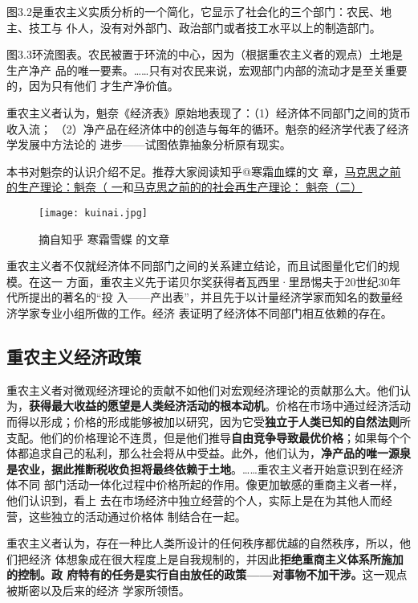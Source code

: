 图3.2是重农主义实质分析的一个简化，它显示了社会化的三个部门：农民、地主、技工与
仆人，没有对外部门、政治部门或者技工水平以上的制造部门。

图3.3环流图表。农民被置于环流的中心，因为（根据重农主义者的观点）土地是生产净产
品的唯一要素。……只有对农民来说，宏观部门内部的流动才是至关重要的，因为只有他们
才生产净价值。

重农主义者认为，魁奈《经济表》原始地表现了：（1）经济体不同部门之间的货币收入流；
（2）净产品在经济体中的创造与每年的循环。魁奈的经济学代表了经济学发展中方法论的
进步——试图依靠抽象分析原有现实。

本书对魁奈的认识介绍不足。推荐大家阅读知乎@寒霜血蝶的文
章，\href{https://zhuanlan.zhihu.com/p/28194917}{马克思之前的生产理论：魁奈（
  一}和\href{https://zhuanlan.zhihu.com/p/28210526}{马克思之前的的社会再生产理论：
  魁奈（二）}

\begin{figure}[ht]
  \centering
  \texttt{[image: kuinai.jpg]}
  \caption{\label{fig:label}摘自知乎 寒霜雪蝶 的文章 }
\end{figure}

重农主义者不仅就经济体不同部门之间的关系建立结论，而且试图量化它们的规模。在这一
方面，重农主义先于诺贝尔奖获得者瓦西里·里昂惕夫于20世纪30年代所提出的著名的“投
入——产出表”，并且先于以计量经济学家而知名的数量经济学家专业小组所做的工作。经济
表证明了经济体不同部门相互依赖的存在。

\subsection{重农主义经济政策}

重农主义者对微观经济理论的贡献不如他们对宏观经济理论的贡献那么大。他们认
为，\textbf{获得最大收益的愿望是人类经济活动的根本动机}。价格在市场中通过经济活动
而得以形成；价格的形成能够被加以研究，因为它受\textbf{独立于人类已知的自然法则}所
支配。他们的价格理论不连贯，但是他们推导\textbf{自由竞争导致最优价格}；如果每个个
体都追求自己的私利，那么社会将从中受益。此外，他们认为，\textbf{净产品的唯一源泉
  是农业，据此推断税收负担将最终依赖于土地}。……重农主义者开始意识到在经济体不同
部门活动一体化过程中价格所起的作用。像更加敏感的重商主义者一样，他们认识到，看上
去在市场经济中独立经营的个人，实际上是在为其他人而经营，这些独立的活动通过价格体
制结合在一起。

重农主义者认为，存在一种比人类所设计的任何秩序都优越的自然秩序，所以，他们把经济
体想象成在很大程度上是自我规制的，并因此\textbf{拒绝重商主义体系所施加的控制。政
  府特有的任务是实行自由放任的政策——对事物不加干涉。}这一观点被斯密以及后来的经济
学家所领悟。

